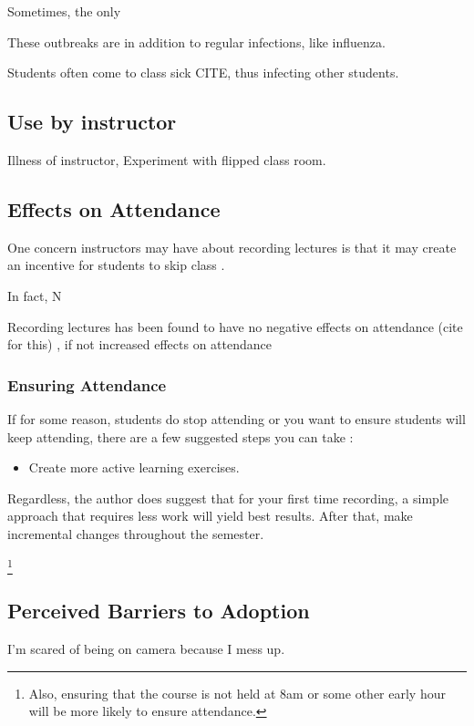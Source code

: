 \documentclass[sigconf]{acmart}
\begin{document}
Sometimes, the only 

These outbreaks are in addition to regular infections, like influenza. 

Students often come to class sick CITE, thus infecting other students.





\subsection{Use by instructor}
Illness of instructor, 
Experiment with flipped class room.


\subsection{Effects on Attendance}
One concern instructors may have about recording lectures is that it may create an incentive for students to skip class \cite{larkin2010but}.

In fact, N


Recording lectures has been found to have no negative effects on attendance (cite for this) \cite{shimoff2001effects}, if not increased effects on attendance \cite{shimoff2001effects}

\subsubsection{Ensuring Attendance}
If for some reason, students do stop attending or you want to ensure students will keep attending, there are a few suggested steps you can take \cite{larkin2010but}:
\begin{itemize}
	\item Create more active learning exercises.
\end{itemize}

Regardless, the author does suggest that for your first time recording, a simple approach that requires less work will yield best results.  After that, make incremental changes throughout the semester.

\footnote{Also, ensuring that the course is not held at 8am or some other early hour will be more likely to ensure attendance.}

\subsection{Perceived Barriers to Adoption}
I'm scared of being on camera because I mess up.
\end{document}
